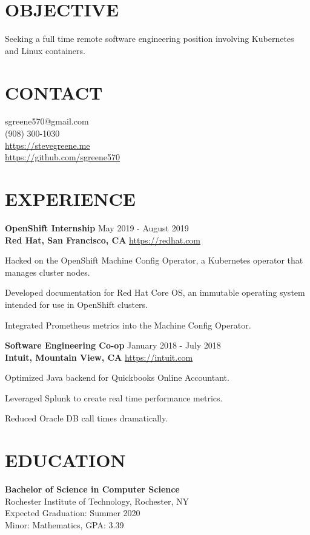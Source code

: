 \documentclass[line, margin, 11pt]{res}
\begin{document}

\begin{resume}

\section{OBJECTIVE}
Seeking a full time remote software engineering position involving Kubernetes and Linux containers.

\section {CONTACT}
sgreene570@gmail.com \\
(908) 300-1030 \\
\url{https://stevegreene.me} \\
\url{https://github.com/sgreene570}

\section{EXPERIENCE}
{\bf \large{OpenShift Internship}} \hfill May 2019 - August 2019 \\
{\bf Red Hat, San Francisco, CA} \hfill \url{https://redhat.com}
\begin{compactitem}
    \item Hacked on the OpenShift Machine Config Operator, a Kubernetes operator that manages cluster nodes.
    \item Developed documentation for Red Hat Core OS, an immutable operating system intended for use in OpenShift clusters.
    \item Integrated Prometheus metrics into the Machine Config Operator.
\end{compactitem}


{\bf \large{Software Engineering Co-op}} \hfill January 2018 - July 2018 \\
{\bf Intuit, Mountain View, CA} \hfill \url{https://intuit.com}
\begin{compactitem}
    \item Optimized Java backend for Quickbooks Online Accountant.
    \item Leveraged Splunk to create real time performance metrics.
    \item Reduced Oracle DB call times dramatically.
\end{compactitem}

\section{EDUCATION}
{\bf Bachelor of Science in Computer Science} \\
Rochester Institute of Technology, Rochester, NY \\
Expected Graduation: Summer 2020 \\
Minor: Mathematics, GPA: 3.39



\end{resume}
\end{document}

